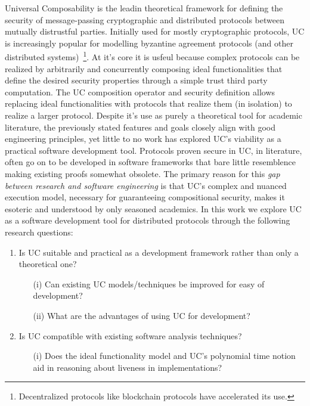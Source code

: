 Universal Composability is the leadin theoretical framework for defining the security of message-passing cryptographic and distributed protocols between mutually distrustful parties.
Initially used for mostly cryptographic protocols, UC is increasingly popular for modelling byzantine agreement protocols (and other distributed systems)~\footnote{Decentralized protocols like blockchain protocols have accelerated its use.}.
At it's core it is usfeul because complex protocols can be realized by arbitrarily and concurrently composing ideal functionalities that define the desired security properties through a simple trust third party computation. 
The UC composition operator and security definition allows replacing ideal functionalities with protocols that realize them (in isolation) to realize a larger protocol. 
Despite it's use as purely a theoretical tool for academic literature, the previously stated features and goals closely align with good engineering principles, yet little to no work has explored UC's viability as a practical software development tool. 
Protocols proven secure in UC, in literature, often go on to be developed in software frameworks that bare little resemblence making existing proofs somewhat obsolete.
The primary reason for this \emph{gap between research and software engineering} is that UC's complex and nuanced execution model, necessary for guaranteeing compositional security, makes it esoteric and understood by only seasoned academics. 
In this work we explore UC as a software development tool for distributed protocols through the following research questions:
\begin{enumerate}[label=(RQ\arabic*).,leftmargin=*]
\item Is UC suitable and practical as a development framework rather than only a theoretical one?
    \begin{itemize}
        \item [(i)] Can existing UC models/techniques be improved for easy of development?
        \item [(ii)] What are the advantages of using UC for development?
    \end{itemize}
\item Is UC compatible with existing software analysis techniques?
    \begin{itemize}
        \item [(i)] Does the ideal functionality model and UC's polynomial time notion aid in reasoning about liveness in implementations?
    \end{itemize}
\end{enumerate}
